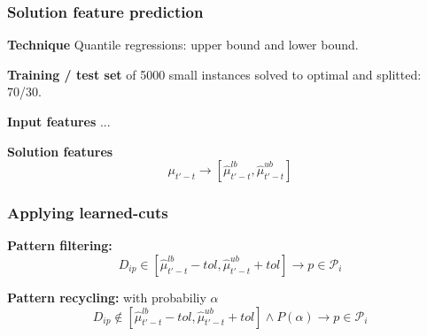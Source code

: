 \begin{frame}
\frametitle{\textbf{Solution feature prediction}}
  
  \begin{block}{\textbf{Technique}}
    Quantile regressions: upper bound and lower bound.
  \end{block}

  \begin{block}{\textbf{Training / test set}}
    of 5000 small instances solved to optimal and splitted: 70/30.
  \end{block}

  \begin{block}{\textbf{Input features}}
    ...
  \end{block}

  \begin{block}{\textbf{Solution features}}
    \begin{equation*}
      \mu_{t'-t} \to [\hat{\mu}_{t'-t}^{lb}, \hat{\mu}_{t'-t}^{ub}]
   \end{equation*}
  \end{block}

\end{frame}

\begin{frame}
\frametitle{\textbf{Applying learned-cuts}}

  \begin{block}{\textbf{Pattern filtering:}}
    \begin{equation*}
      D_{ip} \in [\hat{\mu}_{t'-t}^{lb} - tol, \hat{\mu}_{t'-t}^{ub} + tol] \rightarrow p \in \mathcal{P}_i 
    \end{equation*}
  \end{block}

  \begin{block}{\textbf{Pattern recycling:} with probabiliy $\alpha$}
    \begin{equation*}
      D_{ip} \notin [\hat{\mu}_{t'-t}^{lb} - tol, \hat{\mu}_{t'-t}^{ub} + tol] \land P(\alpha)  \rightarrow p \in \mathcal{P}_i 
    \end{equation*}
  \end{block}
\end{frame}

